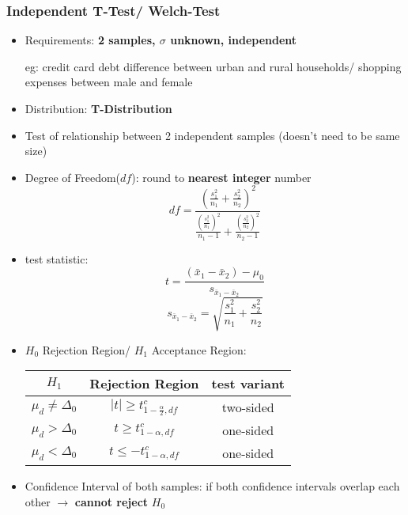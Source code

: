 \subsubsection{Independent T-Test/ Welch-Test}
\begin{itemize}
	\item Requirements: \textbf{2 samples, $\sigma$ unknown, independent}
	
	eg: credit card debt difference between urban and rural households/ shopping expenses between male and female
	\item Distribution: \textbf{T-Distribution}
	\item Test of relationship between 2 independent samples (doesn't need to be same size)
	\item Degree of Freedom($df$): round to \textbf{nearest integer} number
	\large{$$df = \dfrac{(\frac{s_1^2}{n_1} + \frac{s_2^2}{n_2})^2}{\frac{(\frac{s_1^2}{n_1})^2}{n_1 -1} + \frac{(\frac{s_2^2}{n_2})^2}{n_2 -1}}$$} 
	\item test statistic:
	\large{$$t = \frac{(\bar{x}_1 - \bar{x}_2) - \mu_0}{s_{\bar{x}_1 -\bar{x}_2}}$$}
	\large{$$s_{\bar{x}_1 -\bar{x}_2} = \sqrt{\frac{s_1^2}{n_1} + \frac{s_2^2}{n_2}}$$}
	\item $H_0$ Rejection Region/ $H_1$ Acceptance Region:
	\begin{table}[H]
		\begin{center}
			\begin{tabular}{|c|c|c|}
				\hline
				$H_1$ 				& Rejection Region					& test variant \\ \hline
				$\mu_d \neq \Delta_0$	& $|t| \geq t^c_{1-\frac{\alpha}{2}, df}$	& two-sided                 \\ \hline
				$\mu_d > \Delta_0$	& $ t \geq t^c_{1-\alpha, df}$			& one-sided                  \\ \hline
				$\mu_d < \Delta_0$	& $ t \leq -t^c_{1-\alpha,df} $			& one-sided                  \\ \hline
			\end{tabular}
		\end{center}
	\end{table} 
	\item Confidence Interval of both samples: if both confidence intervals overlap each other $\rightarrow$ \textbf{cannot reject} $H_0$
\end{itemize}
